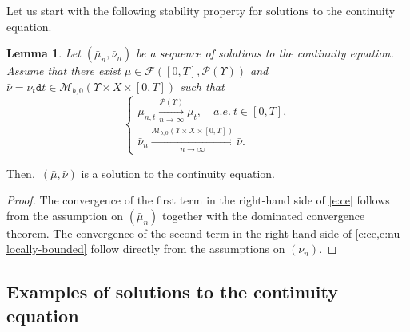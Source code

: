 \documentclass[10pt]{amsart}
\newtheorem{lemma}[theorem]{Lemma}
\theoremstyle{definition}
\theoremstyle{remark}
\begin{document}
Let us start with the following stability property for solutions to the continuity equation.
\begin{lemma}\label{t:ce-stability-limit}
Let $(\bar{\mu}_{n}, \bar{\nu}_{n})$ be a sequence of solutions to the continuity equation.
Assume that there exist $\bar{\mu} \in \mathscr{F}([0,T], \mathscr{P}(\varUpsilon))$ and $\bar{\nu} = \nu_{t} \mathtt{d} t \in \mathscr{M}_{b,0}(\varUpsilon \times X \times [0,T])$ such that
\begin{equation*}
\begin{cases}
\mu_{n,t} \xrightarrow[n \to \infty]{\mathscr{P}(\varUpsilon)} \mu_{t}, \quad a.e.\ t \in [0,T],
\\[8pt]
\bar{\nu}_{n} \xrightarrow[n \to \infty]{\mathscr{M}_{b,0}(\varUpsilon \times X \times [0,T])} \bar{\nu}.
\end{cases}
\end{equation*}
\end{lemma}
Then,~$(\bar{\mu},\bar{\nu})$ is a solution to the continuity equation.

\begin{proof}
The convergence of the first term in the right-hand side of \cref{e:ce} follows from the assumption on $(\bar{\mu}_{n})$ together with the dominated convergence theorem.
The convergence of the second term in the right-hand side of \cref{e:ce,e:nu-locally-bounded} follow directly from the assumptions on $(\bar{\nu}_{n})$.
\end{proof}

\subsection{Examples of solutions to the continuity equation}
\end{document}
